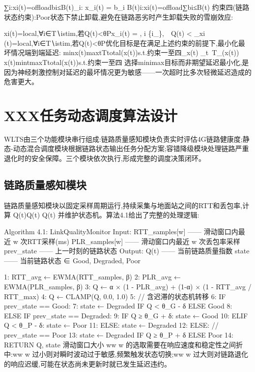 ∑i:xi(t)=offloadbi≤B(t)\sum_{i: x_i(t) = } b_i \leq B(t)i:xi​(t)=offload∑​bi​≤B(t)
约束四(链路状态约束):Poor状态下禁止卸载,避免在链路恶劣时产生卸载失败的雪崩效应:

xi(t)=local,∀i∈T∖{istim},若Q(t)<θPx_i(t) = , \quad \forall i \in {} \setminus \{i_{}\},\ \ Q(t) < \theta_{}xi​(t)=local,∀i∈T∖{istim​},若Q(t)<θP​
优化目标是在满足上述约束的前提下,最小化最坏情况端到端延迟:
min⁡x(t)max⁡tTtotal(x(t))s.t.约束一至四\min_{x(t)} \max_{t}\ T_{}\bigl(x(t)\bigr) \quad {}x(t)min​tmax​Ttotal​(x(t))s.t.约束一至四
选择minimax目标而非期望延迟最小化,是因为神经刺激控制对延迟的最坏情况更为敏感——一次超时比多次轻微延迟造成的危害更大。


\section{XXX任务动态调度算法设计}
WLTS由三个功能模块串行组成:链路质量感知模块负责实时评估4G链路健康度;静态-动态混合调度模块根据链路状态输出任务分配方案;容错降级模块处理链路严重退化时的安全保障。三个模块依次执行,形成完整的调度决策闭环。
\subsection{链路质量感知模块}
链路质量感知模块以固定采样周期运行,持续采集与地面站之间的RTT和丢包率,计算 Q(t)Q(t)
Q(t) 并维护状态机。算法4.1给出了完整的处理逻辑:

Algorithm 4.1: LinkQualityMonitor
Input:  RTT_samples[w]  —— 滑动窗口内最近 w 次RTT采样(ms)
        PLR_samples[w]  —— 滑动窗口内最近 w 次丢包率采样
        prev_state      —— 上一时刻的链路状态
Output: Q(t)            —— 当前链路质量指数
        state           —— 当前链路状态 ∈ {Good, Degraded, Poor}

1:  RTT_avg ← EWMA(RTT_samples, β)
2:  PLR_avg ← EWMA(PLR_samples, β)
3:  Q ← α × (1 - PLR_avg) + (1-α) × (1 - RTT_avg / RTT_max)
4:  Q ← CLAMP(Q, 0.0, 1.0)
5:  // 含迟滞的状态机转移
6:  IF prev_state == Good:
7:      state ← Degraded  IF Q < θ_G - δ  ELSE Good
8:  ELSE IF prev_state == Degraded:
9:      IF Q ≥ θ_G + δ:  state ← Good
10:     ELIF Q < θ_P - δ: state ← Poor
11:     ELSE:             state ← Degraded
12: ELSE:  // prev_state == Poor
13:     state ← Degraded  IF Q ≥ θ_P + δ  ELSE Poor
14: RETURN Q, state
滑动窗口大小 ww
w 的选取需要在响应速度和稳定性之间折中:ww
w 过小则对瞬时波动过于敏感,频繁触发状态切换;ww
w 过大则对链路退化的响应迟缓,可能在状态尚未更新时就已发生延迟违约。


